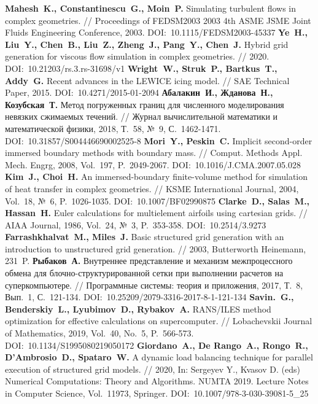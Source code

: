 \begin{thebibliography}{99}
\textbf{Mahesh~K., Constantinescu~G., Moin~P.} Simulating turbulent flows in complex geometries. // Proceedings of FEDSM2003 2003 4th ASME JSME Joint Fluids Engineering Conference, 2003. DOI:~10.1115/FEDSM2003-45337
\textbf{Ye~H., Liu~Y., Chen~B., Liu~Z., Zheng~J., Pang~Y., Chen~J.} Hybrid grid generation for viscous flow simulation in complex geometries. // 2020. DOI:~10.21203/rs.3.rs-31698/v1
\textbf{Wright~W., Struk~P., Bartkus~T., Addy~G.} Recent advances in the LEWICE icing model. // SAE Technical Paper, 2015. DOI:~10.4271/2015-01-2094
\textbf{Абалакин~И., Жданова~Н., Козубская~Т.} Метод погруженных границ для численного моделирования невязких сжимаемых течений. // Журнал вычислительной математики и математической физики, 2018, Т.~58, №~9, С.~1462-1471. DOI:~10.31857/S004446690002525-8
\textbf{Mori~Y., Peskin~C.} Implicit second-order immersed boundary methods with boundary mass. // Comput. Methods Appl. Mech. Engrg, 2008, Vol.~197, P.~2049-2067. DOI:~10.1016/J.CMA.2007.05.028
\textbf{Kim~J., Choi~H.} An immersed-boundary finite-volume method for simulation of heat transfer in complex geometries. // KSME International Journal, 2004, Vol.~18, №~6, P.~1026-1035. DOI:~10.1007/BF02990875
\textbf{Clarke~D., Salas~M., Hassan~H.} Euler calculations for multielement airfoils using cartesian grids. // AIAA Journal, 1986, Vol.~24, №~3, P.~353-358. DOI:~10.2514/3.9273
\textbf{Farrashkhalvat~M., Miles~J.} Basic structured grid generation with an introduction to unstructured grid generation. // 2003, Butterworth Heinemann, 231~P.
\textbf{Рыбаков~А.} Внутреннее представление и механизм межпроцессного обмена для блочно-структурированной сетки при выполнении расчетов на суперкомпьютере. // Программные системы: теория и приложения, 2017, Т.~8, Вып.~1, С.~121-134. DOI:~10.25209/2079-3316-2017-8-1-121-134
\textbf{Savin.~G., Benderskiy~L., Lyubimov~D., Rybakov~A.} RANS/ILES method optimization for effective calculations on supercomputer. // Lobachevskii Journal of Mathematics, 2019, Vol.~40, No.~5, P.~566-573. DOI:~10.1134/S1995080219050172
\textbf{Giordano~A., De Rango~A., Rongo~R., D'Ambrosio~D., Spataro~W.} A dynamic load balancing technique for parallel execution of structured grid models. // 2020, In: Sergeyev Y., Kvasov D. (eds) Numerical Computations: Theory and Algorithms. NUMTA 2019. Lecture Notes in Computer Science, Vol.~11973, Springer. DOI:~10.1007/978-3-030-39081-5\_25

\end{thebibliography}

